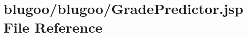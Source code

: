 \hypertarget{GradePredictor_8jsp}{
\section{blugoo/blugoo/GradePredictor.jsp File Reference}
\label{GradePredictor_8jsp}
}


